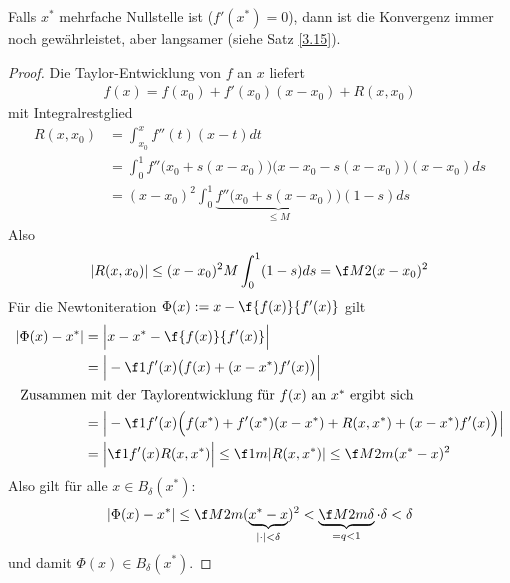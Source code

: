 \documentclass[11pt]{scrbook}
\begin{document}
\begin{st}
\begin{note}
\begin{itemize}
				Falls $x^*$ mehrfache Nullstelle ist ($f'(x^*)=0$), dann ist die Konvergenz immer noch gewährleistet, aber langsamer (siehe Satz \ref{3.15}).
		\end{itemize}
		\begin{proof}
			Die Taylor-Entwicklung von $f$ an $x$ liefert
			\begin{align*}
				f(x) = f(x_0) + f'(x_0)(x-x_0) + R(x,x_0)
			\end{align*}
			mit Integralrestglied
			\begin{align*}
				R(x,x_0) 
				&= \int_{x_0}^x f''(t) (x-t) dt \\
				&= \int_0^1 f''\Big(x_0+s(x-x_0)\Big)  \Big(x-x_0-s(x-x_0)\Big)(x-x_0) ds \\
				&= (x-x_0)^2 \int_0^1 \underbrace{f''\big(x_0+s(x-x_0)\big)}_{\le M} (1-s) ds
			\end{align*}
			Also
			\[
				|R(x,x_0) | \le (x-x_0)^2 M \int_0^1 (1-s) ds = \f M2 (x-x_0)^2
			\]
			Für die Newtoniteration $\Phi(x) := x - \f {f(x)}{f'(x)}$ gilt
			\begin{align*}
				|\Phi(x) - x^*|
				&= \Big|x-x^* - \f {f(x)}{f'(x)}\Big| \\
				&= \Big| -\f 1{f'(x)} \big(f(x) + (x-x^*)f'(x) \big) \Big| \\
			\intertext{
				Zusammen mit der Taylorentwicklung für $f(x)$ an $x^*$ ergibt sich
			}
				&= \Big| -\f 1{f'(x)} \Big(f(x^*) + f'(x^*)(x-x^*) + R(x,x^*) + (x-x^*)f'(x)\Big) \Big| \\
				&= \Big| \f 1{f'(x)} R(x,x^*) \Big| 
				\le \f 1m |R(x,x^*)| 
				\le \f M{2m} (x^* - x)^2
			\end{align*}
			Also gilt für alle $x\in B_\delta(x^*)$:
			\[
				|\Phi(x) - x^*| \le \f M{2m}(\underbrace{x^*-x}_{|\cdot|<\delta})^2 < \underbrace{\f M{2m} \delta}_{=q<1} \cdot \delta < \delta
			\]
			und damit $\Phi(x) \in B_\delta(x^*)$.


\end{proof}
\end{note}
\end{st}
\end{document}
